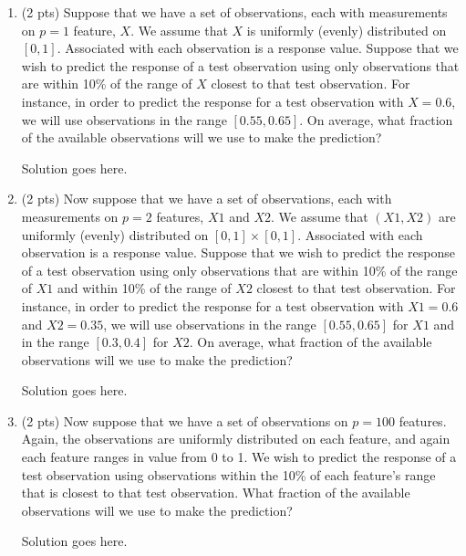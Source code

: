 \documentclass[a4paper]{article}
\theoremstyle{definition}
\newenvironment{soln}{
    \leavevmode\color{blue}\ignorespaces
}{}
\begin{document}
\begin{enumerate}
\begin{enumerate}
	\item (2 pts) Suppose that we have a set of observations, each with measurements on $p =1$ feature, $X$. We assume that $X$ is uniformly (evenly) distributed on $[0, 1]$. Associated with each observation is a response value. Suppose that we wish to predict the response of a test observation using only observations that are within 10\% of the range of $X$ closest to that test observation. For instance, in order to predict the response for a test observation with $X =0.6$, we will use observations in the range $[0.55, 0.65]$. On average, what fraction of the available observations will we use to make the prediction?
	
	\begin{soln}  Solution goes here. \end{soln}
	
	
	\item (2 pts) Now suppose that we have a set of observations, each with measurements on $p =2$ features, $X1$ and $X2$. 
 We assume that $(X1,X2)$ are uniformly (evenly) distributed on $[0, 1] \times [0, 1]$.  Associated with each observation is a response value.
Suppose that we wish to predict the response of a test observation using only observations that are within 10\% of the range of $X1$ and within 10\% of the range of $X2$ closest to that test observation. For instance, in order to predict the response for a test observation with $X1 =0.6$ and $X2 =0.35$, we will use observations in the range $[0.55, 0.65]$ for $X1$ and in the range $[0.3, 0.4]$ for $X2$. On average, what fraction of the available observations will we use to make the prediction?
	
	\begin{soln}  Solution goes here. \end{soln}
	
	\item (2 pts) Now suppose that we have a set of observations on $p = 100$ features. Again, the observations are uniformly distributed on each feature, and again each feature ranges in value from 0 to 1. We wish to predict the response of a test observation using observations within the 10\% of each feature’s range that is closest to that test observation. What fraction of the available observations will we use to make the prediction?
	
	\begin{soln}  Solution goes here. \end{soln}
	

\end{enumerate}
\end{enumerate}
\end{document}
